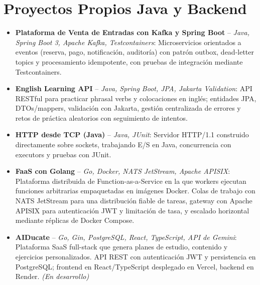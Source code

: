 \documentclass[11pt,a4paper,sans]{moderncv}
\begin{document}

\section{Proyectos Propios Java y Backend}
\vspace{1pt}
\begin{itemize}

\item \textbf{Plataforma de Venta de Entradas con Kafka y Spring Boot} -- \textit{Java, Spring Boot 3, Apache Kafka, Testcontainers}: Microservicios orientados a eventos (reserva, pago, notificación, auditoría) con patrón outbox, dead-letter topics y procesamiento idempotente, con pruebas de integración mediante Testcontainers.

\item \textbf{English Learning API} -- \textit{Java, Spring Boot, JPA, Jakarta Validation}: API RESTful para practicar phrasal verbs y colocaciones en inglés; entidades JPA, DTOs/mappers, validación con Jakarta, gestión centralizada de errores y retos de práctica aleatorios con seguimiento de intentos.

\item \textbf{HTTP desde TCP (Java)} -- \textit{Java, JUnit}: Servidor HTTP/1.1 construido directamente sobre sockets, trabajando E/S en Java, concurrencia con executors y pruebas con JUnit.

\item \textbf{FaaS con Golang} -- \textit{Go, Docker, NATS JetStream, Apache APISIX}: Plataforma distribuida de Function-as-a-Service en la que workers ejecutan funciones arbitrarias empaquetadas en imágenes Docker. Colas de trabajo con NATS JetStream para una distribución fiable de tareas, gateway con Apache APISIX para autenticación JWT y limitación de tasa, y escalado horizontal mediante réplicas de Docker Compose.

\item \textbf{AIDucate} -- \textit{Go, Gin, PostgreSQL, React, TypeScript, API de Gemini}: Plataforma SaaS full-stack que genera planes de estudio, contenido y ejercicios personalizados. API REST con autenticación JWT y persistencia en PostgreSQL; frontend en React/TypeScript desplegado en Vercel, backend en Render. \textit{(En desarrollo)}

\end{itemize}
\end{document}
